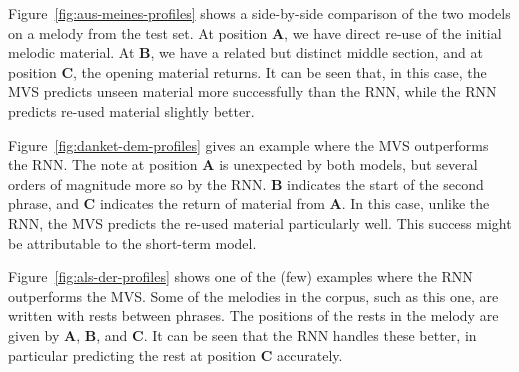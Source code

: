 \documentclass[12pt,a4paper,twoside,openright]{report}
\begin{document}
Figure~\ref{fig:aus-meines-profiles} shows a side-by-side comparison of the two
models on a melody from the test set. At position \textbf{A}, we have direct
re-use of the initial melodic material. At \textbf{B}, we have a related but
distinct middle section, and at position \textbf{C}, the opening material
returns. It can be seen that, in this case, the MVS predicts unseen material
more successfully than the RNN, while the RNN predicts re-used material slightly
better.

Figure~\ref{fig:danket-dem-profiles} gives an example where the MVS outperforms
the RNN. The note at position \textbf{A} is unexpected by both models, but
several orders of magnitude more so by the RNN. \textbf{B} indicates the start
of the second phrase, and \textbf{C} indicates the return of material from
\textbf{A}. In this case, unlike the RNN, the MVS predicts the re-used material
particularly well. This success might be attributable to the short-term model.

Figure~\ref{fig:als-der-profiles} shows one of the (few) examples where the RNN
outperforms the MVS. Some of the melodies in the corpus, such as this one, are
written with rests between phrases. The positions of the rests in the melody
are given by \textbf{A}, \textbf{B}, and \textbf{C}. It can be seen that the RNN
handles these better, in particular predicting the rest at position \textbf{C}
accurately.
\end{document}
